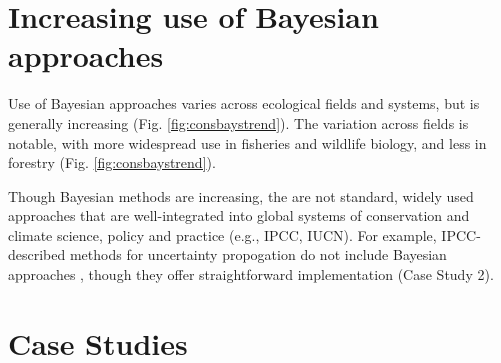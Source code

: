 \documentclass{article}
\begin{document}
\section* {Increasing use of Bayesian approaches}
\par Use of Bayesian approaches varies across ecological fields and systems, but is generally increasing (Fig. \ref{fig:consbaystrend}). The variation across fields is notable, with more widespread use in fisheries and wildlife biology, and less in forestry  (Fig. \ref{fig:consbaystrend}).

\par  Though Bayesian methods are increasing, the are not standard, widely used approaches that are well-integrated into global systems of conservation and climate science, policy and practice (e.g., IPCC, IUCN). For example, IPCC-described methods for uncertainty propogation do not include Bayesian approaches \citep{ipcc2007}, though they offer straightforward implementation (Case Study 2).
\section* {Case Studies}
\end{document}
